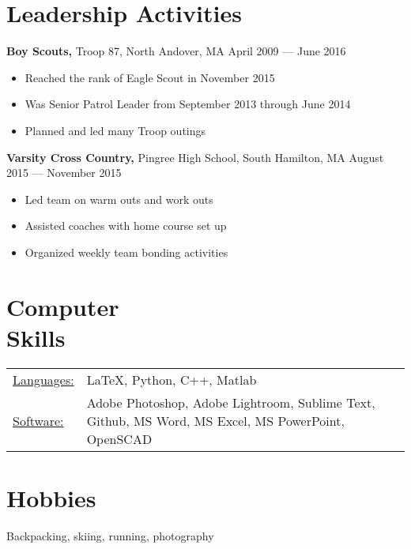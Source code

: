 \documentclass[margin]{res}
\begin{document}
\begin{resume}
	\section{Leadership Activities} 
	{\bf Boy Scouts,} Troop 87, North Andover, MA \hfill April 2009 --- June 2016
	\begin{itemize} \itemsep -2pt
		\item Reached the rank of Eagle Scout in November 2015
		\item Was Senior Patrol Leader from September 2013 through June 2014
		\item Planned and led many Troop outings
	\end{itemize}
	{\bf Varsity Cross Country,} Pingree High School, South Hamilton, MA \hfill August 2015 --- November 2015
	\begin{itemize} \itemsep -2pt
		\item Led team on warm outs and work outs
		\item Assisted coaches with home course set up
		\item Organized weekly team bonding activities
	\end{itemize}
	
	\section{Computer \\ Skills}
	\begin{tabular}{l p{3.5in}}
		\underline{Languages:} & \LaTeX, Python, C++, Matlab \\
		
		\underline{Software:}  & Adobe Photoshop, Adobe Lightroom, Sublime Text, Github, MS Word, MS Excel, MS PowerPoint, OpenSCAD
	\end{tabular}

	\section{Hobbies}
	Backpacking, skiing, running, photography
	
\end{resume} 
\end{document}
